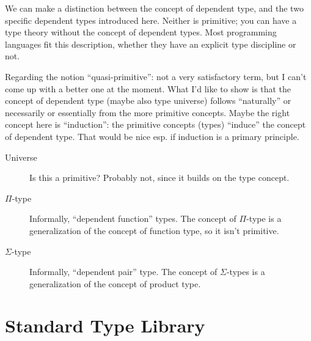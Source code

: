 \begin{ednote}
  We can make a distinction between the concept of dependent type, and
  the two specific dependent types introduced here.  Neither is
  primitive; you can have a type theory without the concept of
  dependent types.  Most programming languages fit this description,
  whether they have an explicit type discipline or not.
\end{ednote}

\begin{ednote}
  Regarding the notion ``quasi-primitive'': not a very satisfactory
  term, but I can't come up with a better one at the moment.  What I'd
  like to show is that the concept of dependent type (maybe also type
  universe) follows ``naturally'' or necessarily or essentially from
  the more primitive concepts.  Maybe the right concept here is
  ``induction'': the primitive concepts (types) ``induce'' the concept
  of dependent type.  That would be nice esp. if induction is a
  primary principle.
\end{ednote}

\begin{description}

\item [Universe]  Is this a primitive?  Probably not, since it builds on the type concept.

\item [\(\Pi\)-type] Informally, ``dependent function''
  types.  The concept of \(\Pi\)-type is a generalization of the
  concept of function type, so it isn't primitive.

\item [\(\Sigma\)-type] Informally, ``dependent pair''
  type.
  The concept of \(\Sigma\)-types is a generalization of the concept
  of product type.

\end{description}

\section{Standard Type Library}
\label{subs:hottstdlib}

